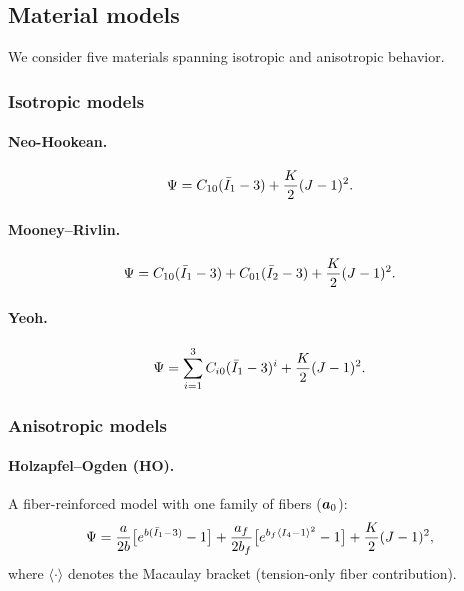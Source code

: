 \subsection{Material models}
\label{sec:continuum:materials}

We consider five materials spanning isotropic and anisotropic behavior.

\subsubsection{Isotropic models}

\paragraph{Neo-Hookean.}
\begin{equation}
  \Psi = C_{10}(\bar{I}_1 - 3) + \frac{K}{2}(J - 1)^2.
  \label{eq:neohooke}
\end{equation}

\paragraph{Mooney--Rivlin.}
\begin{equation}
  \Psi = C_{10}(\bar{I}_1 - 3) + C_{01}(\bar{I}_2 - 3) + \frac{K}{2}(J - 1)^2.
  \label{eq:mooneyrivlin}
\end{equation}

\paragraph{Yeoh.}
\begin{equation}
  \Psi = \sum_{i=1}^{3} C_{i0}(\bar{I}_1 - 3)^i + \frac{K}{2}(J - 1)^2.
  \label{eq:yeoh}
\end{equation}

\subsubsection{Anisotropic models}

\paragraph{Holzapfel--Ogden (HO).}
A fiber-reinforced model with one family of fibers ($\bm{a}_0$):
\begin{equation}
  \Psi = \frac{a}{2b}\bigl[e^{b(\bar{I}_1 - 3)} - 1\bigr]
       + \frac{a_f}{2b_f}\bigl[e^{b_f\langle I_4 - 1 \rangle^2} - 1\bigr]
       + \frac{K}{2}(J - 1)^2,
  \label{eq:holzapfelogden}
\end{equation}
where $\langle \cdot \rangle$ denotes the Macaulay bracket (tension-only fiber
contribution).

